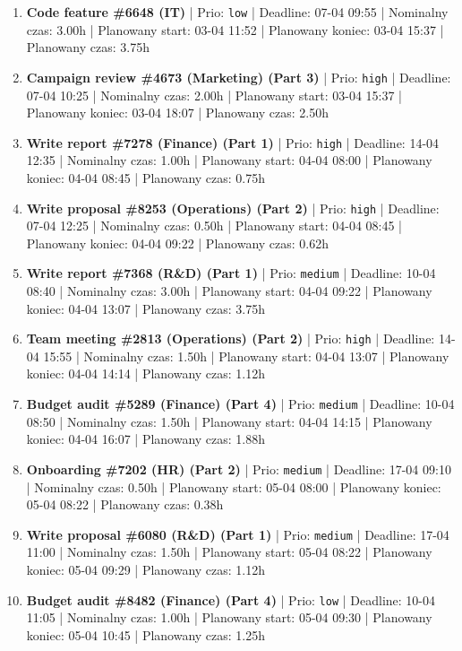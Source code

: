 {\begin{enumerate}
  \item [\textbf{14683}] \textbf{Code feature \#6648 (IT)} | Prio: \texttt{low} | Deadline: 07-04 09:55 | Nominalny czas: 3.00h | Planowany start: 03-04 11:52 | Planowany koniec: 03-04 15:37 | Planowany czas: 3.75h
  \item [\textbf{14625}] \textbf{Campaign review \#4673 (Marketing) (Part 3)} | Prio: \texttt{high} | Deadline: 07-04 10:25 | Nominalny czas: 2.00h | Planowany start: 03-04 15:37 | Planowany koniec: 03-04 18:07 | Planowany czas: 2.50h
  \item [\textbf{14609}] \textbf{Write report \#7278 (Finance) (Part 1)} | Prio: \texttt{high} | Deadline: 14-04 12:35 | Nominalny czas: 1.00h | Planowany start: 04-04 08:00 | Planowany koniec: 04-04 08:45 | Planowany czas: 0.75h
  \item [\textbf{14614}] \textbf{Write proposal \#8253 (Operations) (Part 2)} | Prio: \texttt{high} | Deadline: 07-04 12:25 | Nominalny czas: 0.50h | Planowany start: 04-04 08:45 | Planowany koniec: 04-04 09:22 | Planowany czas: 0.62h
  \item [\textbf{14633}] \textbf{Write report \#7368 (R\&D) (Part 1)} | Prio: \texttt{medium} | Deadline: 10-04 08:40 | Nominalny czas: 3.00h | Planowany start: 04-04 09:22 | Planowany koniec: 04-04 13:07 | Planowany czas: 3.75h
  \item [\textbf{14617}] \textbf{Team meeting \#2813 (Operations) (Part 2)} | Prio: \texttt{high} | Deadline: 14-04 15:55 | Nominalny czas: 1.50h | Planowany start: 04-04 13:07 | Planowany koniec: 04-04 14:14 | Planowany czas: 1.12h
  \item [\textbf{14630}] \textbf{Budget audit \#5289 (Finance) (Part 4)} | Prio: \texttt{medium} | Deadline: 10-04 08:50 | Nominalny czas: 1.50h | Planowany start: 04-04 14:15 | Planowany koniec: 04-04 16:07 | Planowany czas: 1.88h
  \item [\textbf{14648}] \textbf{Onboarding \#7202 (HR) (Part 2)} | Prio: \texttt{medium} | Deadline: 17-04 09:10 | Nominalny czas: 0.50h | Planowany start: 05-04 08:00 | Planowany koniec: 05-04 08:22 | Planowany czas: 0.38h
  \item [\textbf{14669}] \textbf{Write proposal \#6080 (R\&D) (Part 1)} | Prio: \texttt{medium} | Deadline: 17-04 11:00 | Nominalny czas: 1.50h | Planowany start: 05-04 08:22 | Planowany koniec: 05-04 09:29 | Planowany czas: 1.12h
  \item [\textbf{14694}] \textbf{Budget audit \#8482 (Finance) (Part 4)} | Prio: \texttt{low} | Deadline: 10-04 11:05 | Nominalny czas: 1.00h | Planowany start: 05-04 09:30 | Planowany koniec: 05-04 10:45 | Planowany czas: 1.25h

\end{enumerate}}
